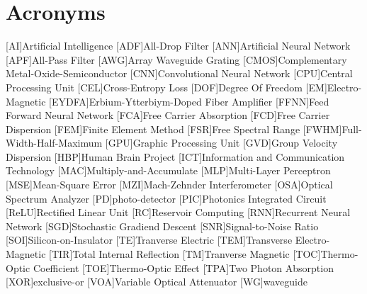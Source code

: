 \chapter*{Acronyms}
\markboth{}{}
\begin{multicols}{2}
\begin{acronym}[EYDFA]
	
	[AI]{Artificial Intelligence}
	[ADF]{All-Drop Filter}
	[ANN]{Artificial Neural Network}
	[APF]{All-Pass Filter}
	[AWG]{Array Waveguide Grating}
	[CMOS]{Complementary Metal-Oxide-Semiconductor}
	[CNN]{Convolutional Neural Network}
	[CPU]{Central Processing Unit}
	[CEL]{Cross-Entropy Loss}
	[DOF]{Degree Of Freedom}
	[EM]{Electro-Magnetic}
	[EYDFA]{Erbium-Ytterbiym-Doped Fiber Amplifier}
	[FFNN]{Feed Forward Neural Network}
	[FCA]{Free Carrier Absorption}
	[FCD]{Free Carrier Dispersion}
	[FEM]{Finite Element Method}
	[FSR]{Free Spectral Range}
	[FWHM]{Full-Width-Half-Maximum}
	[GPU]{Graphic Processing Unit}
	[GVD]{Group Velocity Dispersion}
	[HBP]{Human Brain Project}
	[ICT]{Information and Communication Technology}
	[MAC]{Multiply-and-Accumulate}
	[MLP]{Multi-Layer Perceptron}
	[MSE]{Mean-Square Error}
	[MZI]{Mach-Zehnder Interferometer}
	[OSA]{Optical Spectrum Analyzer}
	[PD]{photo-detector}
	[PIC]{Photonics Integrated Circuit}
	[ReLU]{Rectified Linear Unit}
	[RC]{Reservoir Computing}
	[RNN]{Recurrent Neural Network}
	[SGD]{Stochastic Gradiend Descent}
	[SNR]{Signal-to-Noise Ratio}
	[SOI]{Silicon-on-Insulator}
	[TE]{Tranverse Electric}
	[TEM]{Transverse Electro-Magnetic}
	[TIR]{Total Internal Reflection}
	[TM]{Tranverse Magnetic}
	[TOC]{Thermo-Optic Coefficient}
	[TOE]{Thermo-Optic Effect}
	[TPA]{Two Photon Absorption}
	[XOR]{exclusive-or}
	[VOA]{Variable Optical Attenuator}
	[WG]{waveguide}
\end{acronym}
\end{multicols}
